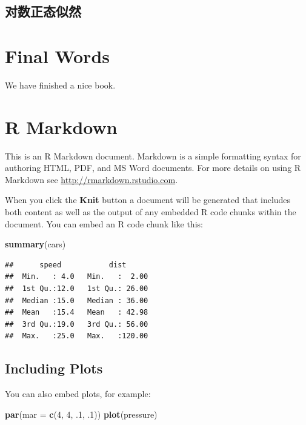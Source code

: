 \documentclass[
  lang=cn,
  11pt,
  scheme=chinese,
  chinesefont=nofont,
  citestyle=gb7714-2015,
  bibstyle=gb7714-2015]{elegantbook}
\newenvironment{Shaded}{\begin{snugshade}}{\end{snugshade}}
\newcommand{\AttributeTok}[1]{\textcolor[rgb]{0.13,0.29,0.53}{#1}}
\newcommand{\DecValTok}[1]{\textcolor[rgb]{0.00,0.00,0.81}{#1}}
\newcommand{\FunctionTok}[1]{\textcolor[rgb]{0.13,0.29,0.53}{\textbf{#1}}}
\newcommand{\NormalTok}[1]{#1}
\begin{document}
\section{对数正态似然}\label{ux5bf9ux6570ux6b63ux6001ux4f3cux7136}

\chapter{Final Words}\label{final-words}

We have finished a nice book.

\appendix


\chapter{R Markdown}\label{r-markdown}

This is an R Markdown document. Markdown is a simple formatting syntax for authoring HTML, PDF, and MS Word documents. For more details on using R Markdown see \url{http://rmarkdown.rstudio.com}.

When you click the \textbf{Knit} button a document will be generated that includes both content as well as the output of any embedded R code chunks within the document. You can embed an R code chunk like this:

\begin{Shaded}
\begin{Highlighting}[]
\FunctionTok{summary}\NormalTok{(cars)}
\end{Highlighting}
\end{Shaded}

\begin{verbatim}
##      speed           dist       
##  Min.   : 4.0   Min.   :  2.00  
##  1st Qu.:12.0   1st Qu.: 26.00  
##  Median :15.0   Median : 36.00  
##  Mean   :15.4   Mean   : 42.98  
##  3rd Qu.:19.0   3rd Qu.: 56.00  
##  Max.   :25.0   Max.   :120.00
\end{verbatim}

\section{Including Plots}\label{including-plots}

You can also embed plots, for example:

\begin{Shaded}
\begin{Highlighting}[]
\FunctionTok{par}\NormalTok{(}\AttributeTok{mar =} \FunctionTok{c}\NormalTok{(}\DecValTok{4}\NormalTok{, }\DecValTok{4}\NormalTok{, .}\DecValTok{1}\NormalTok{, .}\DecValTok{1}\NormalTok{))}
\FunctionTok{plot}\NormalTok{(pressure)}
\end{Highlighting}
\end{Shaded}
\end{document}
